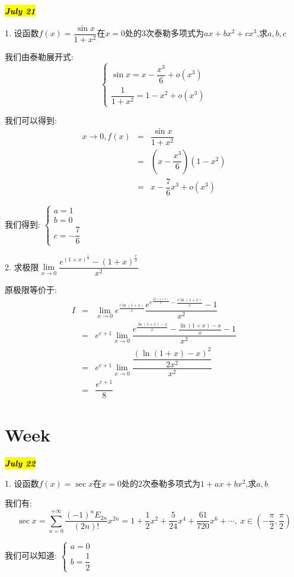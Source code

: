 \hl{\textbf{\textit{July 21}}}

1. 设函数$f(x)=\dfrac{\sin x}{1+x^2}$在$x=0$处的$3$次泰勒多项式为$ax+bx^2+cx^3$,求$a,b,c$
\begin{solution}
	
	我们由泰勒展开式: $$\left\lbrace
	\begin{array}{l}
		\sin x=x-\dfrac{x^3}{6}+o(x^3)\\
		\dfrac{1}{1+x^2}=1-x^2+o(x^3)
	\end{array}
	\right. $$
	
	我们可以得到: 
	\begin{eqnarray*}
		x\rightarrow 0, f(x)&=&\dfrac{\sin x}{1+x^2}\\
		&=&(x-\dfrac{x^3}{6})(1-x^2)\\
		&=&x-\dfrac{7}{6}x^3+o(x^3)
	\end{eqnarray*}
	
	我们得到: $\left\lbrace
	\begin{array}{l}
		a=1\\b=0\\c=-\dfrac{7}{6}
	\end{array}
	\right. $
\end{solution}

2. 求极限$\lim\limits_{x\rightarrow 0}\dfrac{e^{(1+x)^{\frac{1}{x}}}-(1+x)^{\frac{e}{x}}}{x^2}$
\begin{solution}
	
	原极限等价于: 
	\begin{eqnarray*}
		I&=&\lim\limits_{x\rightarrow 0}e^{\frac{e\ln(1+x)}{x}}\dfrac{e^{e^{\frac{\ln(1+x)}{x}}-\frac{e\ln(1+x)}{x}}-1}{x^2}\\
		&=&e^{e+1}\lim\limits_{x\rightarrow 0}\dfrac{e^{\frac{\ln(1+x)-x}{x}}-\frac{\ln(1+x)-x}{x}-1}{x^2}\\
		&=&e^{e+1}\lim\limits_{x\rightarrow 0}\dfrac{\dfrac{(\ln(1+x)-x)^2}{2x^2}}{x^2}\\
		&=&\dfrac{e^{e+1}}{8}
	\end{eqnarray*}
\end{solution}

\section{Week }
\hl{\textbf{\textit{July 22}}}

1. 设函数$f(x)=\sec x$在$x=0$处的$2$次泰勒多项式为$1+ax+bx^2$,求$a,b$
\begin{solution}
	
	我们有: $$\sec x=\sum\limits_{n=0}^{+\infty}\dfrac{(-1)^nE_{2n}}{(2n)!}x^{2n}=1+\dfrac{1}{2}x^2+\dfrac{5}{24}x^4+\dfrac{61}{720}x^6+\cdots,\ x\in(-\dfrac{\pi}{2},\dfrac{\pi}{2})$$
	
	我们可以知道: $\left\lbrace
	\begin{array}{l}
		a=0\\b=\dfrac{1}{2}
	\end{array}
	\right. $
\end{solution}

